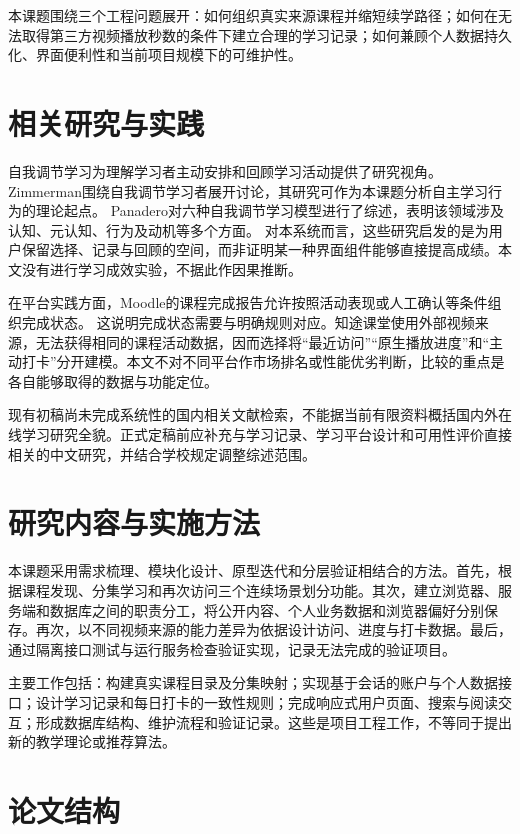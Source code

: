 \documentclass[UTF8,12pt,a4paper,oneside,openany]{ctexbook}
\begin{document}
本课题围绕三个工程问题展开：如何组织真实来源课程并缩短续学路径；如何在无法取得第三方视频播放秒数的条件下建立合理的学习记录；如何兼顾个人数据持久化、界面便利性和当前项目规模下的可维护性。


\section{相关研究与实践}

自我调节学习为理解学习者主动安排和回顾学习活动提供了研究视角。Zimmerman围绕自我调节学习者展开讨论，其研究可作为本课题分析自主学习行为的理论起点。\cite{ref1} Panadero对六种自我调节学习模型进行了综述，表明该领域涉及认知、元认知、行为及动机等多个方面。\cite{ref2} 对本系统而言，这些研究启发的是为用户保留选择、记录与回顾的空间，而非证明某一种界面组件能够直接提高成绩。本文没有进行学习成效实验，不据此作因果推断。


在平台实践方面，Moodle的课程完成报告允许按照活动表现或人工确认等条件组织完成状态。\cite{ref3} 这说明完成状态需要与明确规则对应。知途课堂使用外部视频来源，无法获得相同的课程活动数据，因而选择将“最近访问”“原生播放进度”和“主动打卡”分开建模。本文不对不同平台作市场排名或性能优劣判断，比较的重点是各自能够取得的数据与功能定位。


现有初稿尚未完成系统性的国内相关文献检索，不能据当前有限资料概括国内外在线学习研究全貌。正式定稿前应补充与学习记录、学习平台设计和可用性评价直接相关的中文研究，并结合学校规定调整综述范围。


\section{研究内容与实施方法}

本课题采用需求梳理、模块化设计、原型迭代和分层验证相结合的方法。首先，根据课程发现、分集学习和再次访问三个连续场景划分功能。其次，建立浏览器、服务端和数据库之间的职责分工，将公开内容、个人业务数据和浏览器偏好分别保存。再次，以不同视频来源的能力差异为依据设计访问、进度与打卡数据。最后，通过隔离接口测试与运行服务检查验证实现，记录无法完成的验证项目。


主要工作包括：构建真实课程目录及分集映射；实现基于会话的账户与个人数据接口；设计学习记录和每日打卡的一致性规则；完成响应式用户页面、搜索与阅读交互；形成数据库结构、维护流程和验证记录。这些是项目工程工作，不等同于提出新的教学理论或推荐算法。


\section{论文结构}
\end{document}
